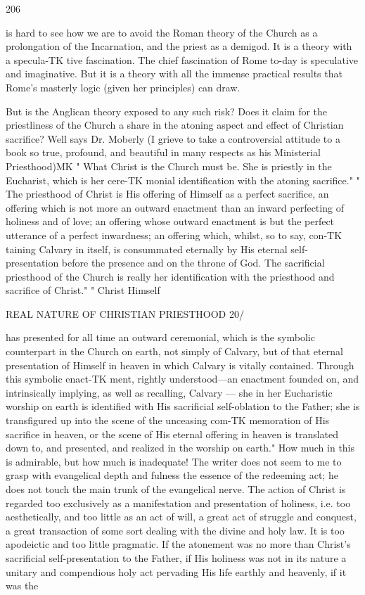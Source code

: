 \documentclass[12pt,a5paper,twoside]{book}
\begin{document}
{{206 



is hard to see how we are to avoid the Roman theory 
of the Church as a prolongation of the Incarnation, and 
the priest as a demigod. It is a theory with a specula-TK
tive fascination. The chief fascination of Rome to-day 
is speculative and imaginative. But it is a theory 
with all the immense practical results that Rome's 
masterly logic (given her principles) can draw. 

But is the Anglican theory exposed to any such 
risk? Does it claim for the priestliness of the Church 
a share in the atoning aspect and effect of Christian 
sacrifice? Well says Dr. Moberly (I grieve to take 
a controversial attitude to a book so true, profound, 
and beautiful in many respects as his Ministerial 
Priesthood)MK " What Christ is the Church must be. 
She is priestly in the Eucharist, which is her cere-TK
monial identification with the atoning sacrifice." 
" The priesthood of Christ is His offering of Himself 
as a perfect sacrifice, an offering which is not more 
an outward enactment than an inward perfecting of 
holiness and of love; an offering whose outward 
enactment is but the perfect utterance of a perfect 
inwardness; an offering which, whilst, so to say, con-TK
taining Calvary in itself, is consummated eternally by 
His eternal self-presentation before the presence and 
on the throne of God. The sacrificial priesthood 
of the Church is really her identification with the 
priesthood and sacrifice of Christ." " Christ Himself 



REAL NATURE OF CHRISTIAN PRIESTHOOD 20/ 

has presented for all time an outward ceremonial, 
which is the symbolic counterpart in the Church on 
earth, not simply of Calvary, but of that eternal 
presentation of Himself in heaven in which Calvary 
is vitally contained. Through this symbolic enact-TK
ment, rightly understood---an enactment founded on, 
and intrinsically implying, as well as recalling, Calvary 
— she in her Eucharistic worship on earth is identified 
with His sacrificial self-oblation to the Father; she is 
transfigured up into the scene of the unceasing com-TK
memoration of His sacrifice in heaven, or the scene of 
His eternal offering in heaven is translated down to, 
and presented, and realized in the worship on earth." 
How much in this is admirable, but how much is 
inadequate! The writer does not seem to me to grasp 
with evangelical depth and fulness the essence of the 
redeeming act; he does not touch the main trunk of 
the evangelical nerve. The action of Christ is regarded 
too exclusively as a manifestation and presentation of 
holiness, i.e. too aesthetically, and too little as an act 
of will, a great act of struggle and conquest, a great 
transaction of some sort dealing with the divine and 
holy law. It is too apodeictic and too little pragmatic. 
If the atonement was no more than Christ's sacrificial 
self-presentation to the Father, if His holiness was 
not in its nature a unitary and compendious holy act 
pervading His life earthly and heavenly, if it was the 



}}
\end{document}
